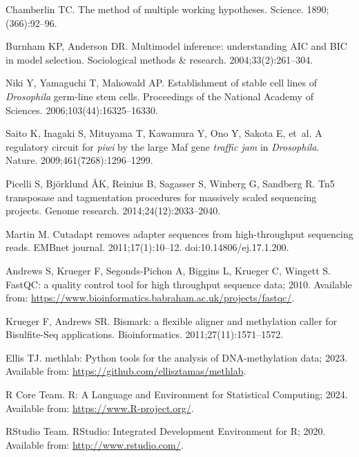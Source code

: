 \documentclass[10pt,draft,letterpaper]{article}
\begin{document}
\begin{thebibliography}{10}
Chamberlin TC.
\newblock The method of multiple working hypotheses.
\newblock Science. 1890;(366):92--96.

Burnham KP, Anderson DR.
\newblock Multimodel inference: understanding AIC and BIC in model selection.
\newblock Sociological methods \& research. 2004;33(2):261--304.

Niki Y, Yamaguchi T, Mahowald AP.
\newblock Establishment of stable cell lines of \emph{Drosophila} germ-line stem cells.
\newblock Proceedings of the National Academy of Sciences. 2006;103(44):16325--16330.

Saito K, Inagaki S, Mituyama T, Kawamura Y, Ono Y, Sakota E, et~al.
\newblock A regulatory circuit for \textit{piwi} by the large Maf gene \textit{traffic jam} in \textit{Drosophila}.
\newblock Nature. 2009;461(7268):1296--1299.

Picelli S, Bj{\"o}rklund {\AA}K, Reinius B, Sagasser S, Winberg G, Sandberg R.
\newblock Tn5 transposase and tagmentation procedures for massively scaled sequencing projects.
\newblock Genome research. 2014;24(12):2033--2040.

Martin M.
\newblock Cutadapt removes adapter sequences from high-throughput sequencing reads.
\newblock EMBnet journal. 2011;17(1):10--12.
\newblock doi:{10.14806/ej.17.1.200}.

Andrews S, Krueger F, Segonds-Pichon A, Biggins L, Krueger C, Wingett S. FastQC: a quality control tool for high throughput sequence data; 2010.
\newblock Available from: \url{https://www.bioinformatics.babraham.ac.uk/projects/fastqc/}.

Krueger F, Andrews SR.
\newblock Bismark: a flexible aligner and methylation caller for Bisulfite-Seq applications.
\newblock Bioinformatics. 2011;27(11):1571--1572.

Ellis TJ. methlab: Python tools for the analysis of DNA-methylation data; 2023.
\newblock Available from: \url{https://github.com/ellisztamas/methlab}.

{R Core Team}. R: A Language and Environment for Statistical Computing; 2024.
\newblock Available from: \url{https://www.R-project.org/}.

{RStudio Team}. RStudio: Integrated Development Environment for R; 2020.
\newblock Available from: \url{http://www.rstudio.com/}.


\end{thebibliography}
\end{document}
